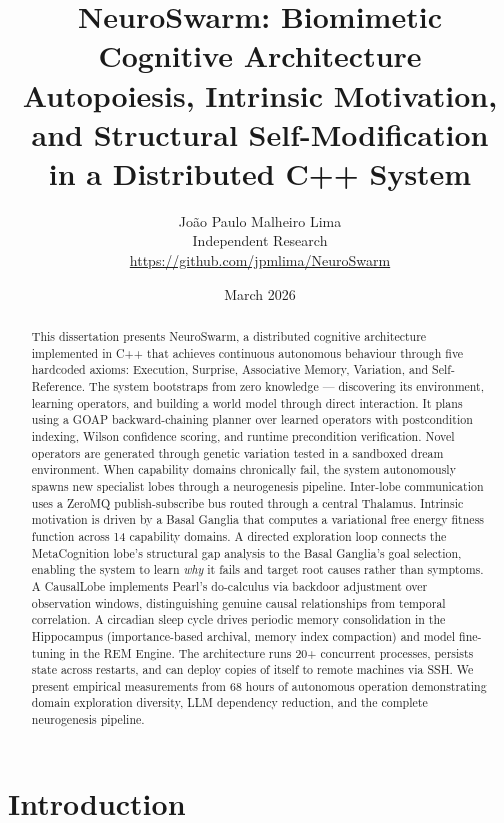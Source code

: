 \documentclass[12pt,a4paper]{report}
\title{\textbf{NeuroSwarm: Biomimetic Cognitive Architecture}\\
\large Autopoiesis, Intrinsic Motivation, and Structural Self-Modification\\in a Distributed C++ System}
\author{João Paulo Malheiro Lima\\
\small Independent Research\\
\small \url{https://github.com/jpmlima/NeuroSwarm}}
\date{March 2026}
\begin{document}
\maketitle

\begin{abstract}
This dissertation presents NeuroSwarm, a distributed cognitive architecture implemented in C++ that achieves continuous autonomous behaviour through five hardcoded axioms: Execution, Surprise, Associative Memory, Variation, and Self-Reference. The system bootstraps from zero knowledge --- discovering its environment, learning operators, and building a world model through direct interaction. It plans using a GOAP backward-chaining planner over learned operators with postcondition indexing, Wilson confidence scoring, and runtime precondition verification. Novel operators are generated through genetic variation tested in a sandboxed dream environment. When capability domains chronically fail, the system autonomously spawns new specialist lobes through a neurogenesis pipeline. Inter-lobe communication uses a ZeroMQ publish-subscribe bus routed through a central Thalamus. Intrinsic motivation is driven by a Basal Ganglia that computes a variational free energy fitness function across 14 capability domains. A directed exploration loop connects the MetaCognition lobe's structural gap analysis to the Basal Ganglia's goal selection, enabling the system to learn \emph{why} it fails and target root causes rather than symptoms. A CausalLobe implements Pearl's do-calculus via backdoor adjustment over observation windows, distinguishing genuine causal relationships from temporal correlation. A circadian sleep cycle drives periodic memory consolidation in the Hippocampus (importance-based archival, memory index compaction) and model fine-tuning in the REM Engine. The architecture runs 20+ concurrent processes, persists state across restarts, and can deploy copies of itself to remote machines via SSH. We present empirical measurements from 68 hours of autonomous operation demonstrating domain exploration diversity, LLM dependency reduction, and the complete neurogenesis pipeline.
\end{abstract}

\tableofcontents

\chapter{Introduction}
\end{document}
